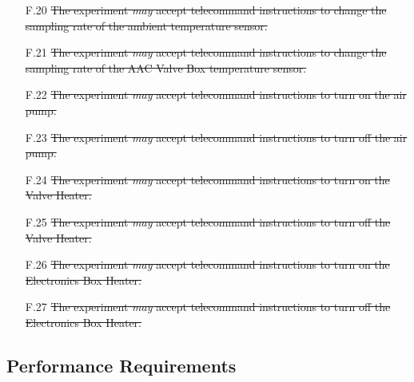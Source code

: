 \documentclass[a4paper,12pt,twoside]{article}
\providecommand{\DIFaddtex}[1]{{\protect\color{blue}\uwave{#1}}} %
\providecommand{\DIFaddend}{} %
\providecommand{\DIFadd}[1]{\texorpdfstring{\DIFaddtex{#1}}{#1}} %
\DeclareRobustCommand{\DIFaddend}{\DIFOaddend \let\includegraphics\DIFOincludegraphics} %
\begin{document}
\begin{enumerate}
{    }\item[F.20] \st{The experiment \textit{may} accept telecommand instructions to change the sampling rate of the ambient temperature sensor.}\DIFadd{\textsuperscript{\ref{fn:unnecessary-requirement}}
    }\item[F.21] \st{The experiment \textit{may} accept telecommand instructions to change the sampling rate of the AAC Valve Box temperature sensor.}\DIFadd{\textsuperscript{\ref{fn:unnecessary-requirement}}
    }\item[F.22] \st{The experiment \textit{may} accept telecommand instructions to turn on the air pump.}\DIFadd{\textsuperscript{\ref{fn:unnecessary-requirement}}
    }\item[F.23] \st{The experiment \textit{may} accept telecommand instructions to turn off the air pump.}\DIFadd{\textsuperscript{\ref{fn:unnecessary-requirement}}
    }\item[F.24] \st{The experiment \textit{may} accept telecommand instructions to turn on the Valve Heater.}\DIFadd{\textsuperscript{\ref{fn:unnecessary-requirement}}
    }\item[F.25] \st{The experiment \textit{may} accept telecommand instructions to turn off the Valve Heater.}\DIFadd{\textsuperscript{\ref{fn:unnecessary-requirement}}
    }\item[F.26] \st{The experiment \textit{may} accept telecommand instructions to turn on the Electronics Box Heater.}\DIFadd{\textsuperscript{\ref{fn:unnecessary-requirement}}
    }\item[F.27] \st{The experiment \textit{may} accept telecommand instructions to turn off the Electronics Box Heater.}\DIFadd{\textsuperscript{\ref{fn:unnecessary-requirement}}
}\DIFaddend \end{enumerate}
\pagebreak
\subsection{Performance Requirements}
\end{document}
